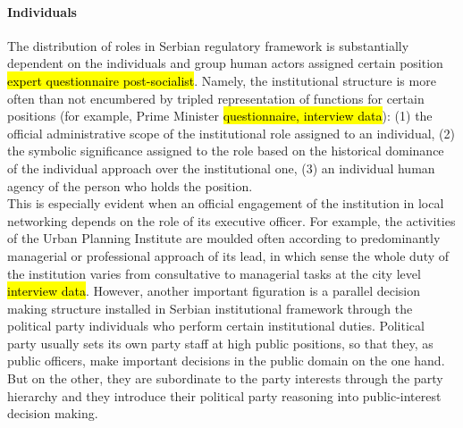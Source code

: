 \documentclass[11pt]{report}
\begin{document}
\paragraph{Individuals}
The distribution of roles in Serbian regulatory framework is substantially dependent on the individuals and group human actors assigned certain position \hl{expert questionnaire post-socialist}. Namely, the institutional structure is more often than not encumbered by tripled representation of functions for certain positions (for example, Prime Minister \hl{questionnaire, interview data}):
(1) the official administrative scope of the institutional role assigned to an individual,
(2) the symbolic significance assigned to the role based on the historical dominance of the individual approach over the institutional one,
(3) an individual human agency of the person who holds the position.
\\
This is especially evident when an official engagement of the institution in local networking depends on the role of its executive officer. For example, the activities of the Urban Planning Institute are moulded often according to predominantly managerial or professional approach of its lead, in which sense the whole duty of the institution varies from consultative to managerial tasks at the city level \hl{interview data}. 
However, another important figuration is a parallel decision making structure  installed in Serbian institutional framework through the political party individuals who perform certain institutional duties.
Political party usually sets its own party staff at high public positions, so that they, as public officers, make important decisions in the public domain on the one hand. But on the other, they are subordinate to the party interests through the party hierarchy and they introduce their political party reasoning into public-interest decision making. \footnotemark
{}
\end{document}
